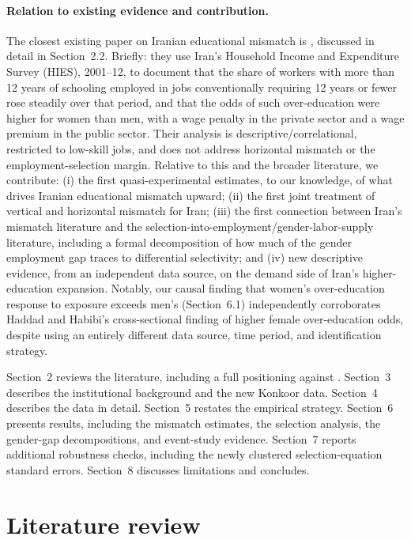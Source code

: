\documentclass[11pt]{article}
\begin{document}
\paragraph{Relation to existing evidence and contribution.} The closest existing paper on Iranian educational mismatch is \citet{haddad2017}, discussed in detail in Section~2.2. Briefly: they use Iran's Household Income and Expenditure Survey (HIES), 2001--12, to document that the share of workers with more than 12 years of schooling employed in jobs conventionally requiring 12 years or fewer rose steadily over that period, and that the odds of such over-education were higher for women than men, with a wage penalty in the private sector and a wage premium in the public sector. Their analysis is descriptive/correlational, restricted to low-skill jobs, and does not address horizontal mismatch or the employment-selection margin. Relative to this and the broader literature, we contribute: (i) the first quasi-experimental estimates, to our knowledge, of what drives Iranian educational mismatch upward; (ii) the first joint treatment of vertical and horizontal mismatch for Iran; (iii) the first connection between Iran's mismatch literature and the selection-into-employment/gender-labor-supply literature, including a formal decomposition of how much of the gender employment gap traces to differential selectivity; and (iv) new descriptive evidence, from an independent data source, on the demand side of Iran's higher-education expansion. Notably, our causal finding that women's over-education response to exposure exceeds men's (Section~6.1) independently corroborates Haddad and Habibi's cross-sectional finding of higher female over-education odds, despite using an entirely different data source, time period, and identification strategy.

Section~2 reviews the literature, including a full positioning against \citet{haddad2017}. Section~3 describes the institutional background and the new Konkoor data. Section~4 describes the data in detail. Section~5 restates the empirical strategy. Section~6 presents results, including the mismatch estimates, the selection analysis, the gender-gap decompositions, and event-study evidence. Section~7 reports additional robustness checks, including the newly clustered selection-equation standard errors. Section~8 discusses limitations and concludes.

\section{Literature review}
\end{document}
